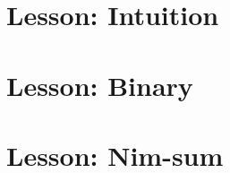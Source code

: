 \section{Lesson: Intuition}
\label{sec:results_intuition}
\section{Lesson: Binary}
\label{sec:results_binary}
\section{Lesson: Nim-sum}
\label{sec:results_nimsum}

